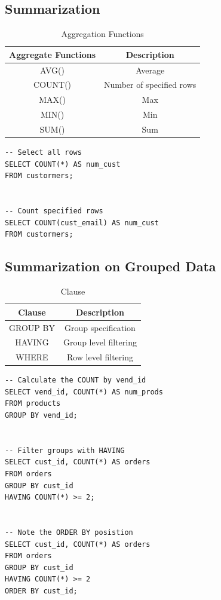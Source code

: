 \documentclass[12pt,oneside,a4paper]{article}
\begin{document}
\subsection{Summarization}
\begin{table}[h]
	\centering
	\begin{tabular}{ |c|c|} 
		\hline
		Aggregate Functions & Description\\ 
		\hline
		AVG() & Average \\ 
		COUNT() & Number of specified rows\\ 
		MAX() & Max\\ 
		MIN() & Min\\ 
		SUM() & Sum\\ 
		\hline
	\end{tabular}
	\caption{Aggregation Functions}
\end{table}


\begin{lstlisting}
-- Select all rows 
SELECT COUNT(*) AS num_cust
FROM custormers;


-- Count specified rows 
SELECT COUNT(cust_email) AS num_cust
FROM custormers;
\end{lstlisting}

\subsection{Summarization on Grouped Data}

\begin{table}[h]
	\centering
	\begin{tabular}{ |c|c|} 
		\hline
		Clause & Description\\ 
		\hline
		GROUP BY & Group specification \\ 
		HAVING & Group level filtering\\ 
		WHERE & Row level filtering\\ 
		\hline
	\end{tabular}
	\caption{Clause}
\end{table}
\begin{lstlisting}
-- Calculate the COUNT by vend_id 
SELECT vend_id, COUNT(*) AS num_prods 
FROM products
GROUP BY vend_id;


-- Filter groups with HAVING
SELECT cust_id, COUNT(*) AS orders 
FROM orders 
GROUP BY cust_id 
HAVING COUNT(*) >= 2;


-- Note the ORDER BY posistion 
SELECT cust_id, COUNT(*) AS orders 
FROM orders 
GROUP BY cust_id 
HAVING COUNT(*) >= 2
ORDER BY cust_id;
\end{lstlisting}
\end{document}
